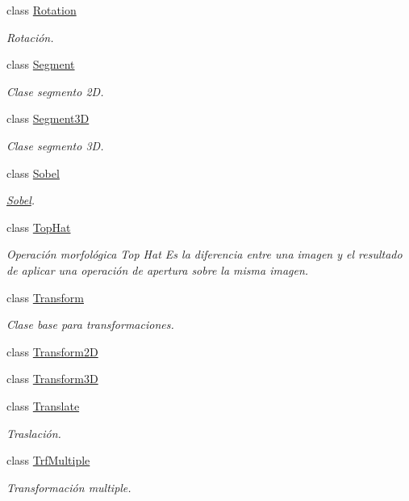 \begin{DoxyCompactItemize}
class \hyperlink{class_i3_d_1_1_rotation}{Rotation}
\begin{DoxyCompactList}\small\item\em Rotación. \end{DoxyCompactList}\item 
class \hyperlink{class_i3_d_1_1_segment}{Segment}
\begin{DoxyCompactList}\small\item\em Clase segmento 2D. \end{DoxyCompactList}\item 
class \hyperlink{class_i3_d_1_1_segment3_d}{Segment3D}
\begin{DoxyCompactList}\small\item\em Clase segmento 3D. \end{DoxyCompactList}\item 
class \hyperlink{class_i3_d_1_1_sobel}{Sobel}
\begin{DoxyCompactList}\small\item\em \hyperlink{class_i3_d_1_1_sobel}{Sobel}. \end{DoxyCompactList}\item 
class \hyperlink{class_i3_d_1_1_top_hat}{Top\+Hat}
\begin{DoxyCompactList}\small\item\em Operación morfológica Top Hat Es la diferencia entre una imagen y el resultado de aplicar una operación de apertura sobre la misma imagen. \end{DoxyCompactList}\item 
class \hyperlink{class_i3_d_1_1_transform}{Transform}
\begin{DoxyCompactList}\small\item\em Clase base para transformaciones. \end{DoxyCompactList}\item 
class \hyperlink{class_i3_d_1_1_transform2_d}{Transform2D}
\item 
class \hyperlink{class_i3_d_1_1_transform3_d}{Transform3D}
\item 
class \hyperlink{class_i3_d_1_1_translate}{Translate}
\begin{DoxyCompactList}\small\item\em Traslación. \end{DoxyCompactList}\item 
class \hyperlink{class_i3_d_1_1_trf_multiple}{Trf\+Multiple}
\begin{DoxyCompactList}\small\item\em Transformación multiple. \end{DoxyCompactList}\item 

\end{DoxyCompactItemize}
